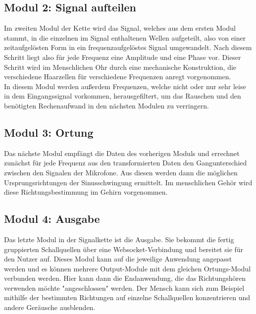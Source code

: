 \subsection{Modul 2: Signal aufteilen}
Im zweiten Modul der Kette wird das Signal, welches aus dem ersten Modul stammt, in die einzelnen im Signal enthaltenen Wellen aufgeteilt, also von einer zeitaufgelösten Form in ein frequenzaufgelöstes Signal umgewandelt. Nach diesem Schritt liegt also für jede Frequenz eine Amplitude und eine Phase vor. Dieser Schritt wird im Menschlichen Ohr durch eine mechanische Konstruktion, die verschiedene Haarzellen für verschiedene Frequenzen anregt vorgenommen.\\
In diesem Modul werden außerdem Frequenzen, welche nicht oder nur sehr leise in dem Eingangssignal vorkommen, herausgefiltert, um das Rauschen und den benötigten Rechenaufwand in den nächsten Modulen zu verringern.\\

\subsection{Modul 3: Ortung}
Das nächste Modul empfängt die Daten des vorherigen Moduls und errechnet zunächst für jede Frequenz aus den transformierten Daten den Gangunterschied zwischen den Signalen der Mikrofone. Aus diesen werden dann die möglichen Ursprungsrichtungen der Sinusschwingung ermittelt. Im menschlichen Gehör wird diese Richtungsbestimmung im Gehirn vorgenommen.

\subsection{Modul 4: Ausgabe}
Das letzte Modul in der Signalkette ist die Ausgabe. Sie bekommt die fertig gruppierten Schallquellen über eine Websocket-Verbindung und bereitet sie für den Nutzer auf. Dieses Modul kann auf die jeweilige Anwendung angepasst werden und es können mehrere Output-Module mit dem gleichen Ortungs-Modul verbunden werden. Hier kann dann die Endanwendung, die das Richtungshören verwenden möchte "angeschlossen" werden. Der Mensch kann sich zum Beispiel mithilfe der bestimmten Richtungen auf einzelne Schallquellen konzentrieren und andere Geräusche ausblenden. 
